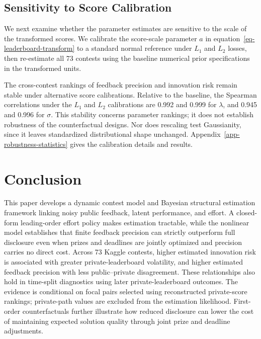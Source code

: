 \documentclass[mnsc]{informs3}
\begin{document}
\subsection{Sensitivity to Score Calibration}\label{sect-robust-normality}

{We next examine whether the parameter estimates are sensitive to the scale of the transformed scores. We calibrate the score-scale parameter $a$ in equation~\eqref{eq-leaderboard-transform} to a standard normal reference under $L_1$ and $L_2$ losses, then re-estimate all 73 contests using the baseline numerical prior specifications in the transformed units.}

The cross-contest rankings of feedback precision and innovation risk remain stable under alternative score calibrations. Relative to the baseline, the Spearman correlations under the $L_1$ and $L_2$ calibrations are 0.992 and 0.999 for $\lambda$, and 0.945 and 0.996 for $\sigma$. This stability concerns parameter rankings; it does not establish robustness of the counterfactual designs. Nor does rescaling test Gaussianity, since it leaves standardized distributional shape unchanged. Appendix~\ref{app-robustness-statistics} gives the calibration details and results.



\section{Conclusion}

This paper develops a dynamic contest model and Bayesian structural estimation framework linking noisy public feedback, latent performance, and effort. A closed-form leading-order effort policy makes estimation tractable, while the nonlinear model establishes that finite feedback precision can strictly outperform full disclosure even when prizes and deadlines are jointly optimized and precision carries no direct cost. Across 73 Kaggle contests, higher estimated innovation risk is associated with greater private-leaderboard volatility, and higher estimated feedback precision with less public--private disagreement. These relationships also hold in time-split diagnostics using later private-leaderboard outcomes. The evidence is conditional on focal pairs selected using reconstructed private-score rankings; private-path values are excluded from the estimation likelihood. First-order counterfactuals further illustrate how reduced disclosure can lower the cost of maintaining expected solution quality through joint prize and deadline adjustments.
\end{document}
